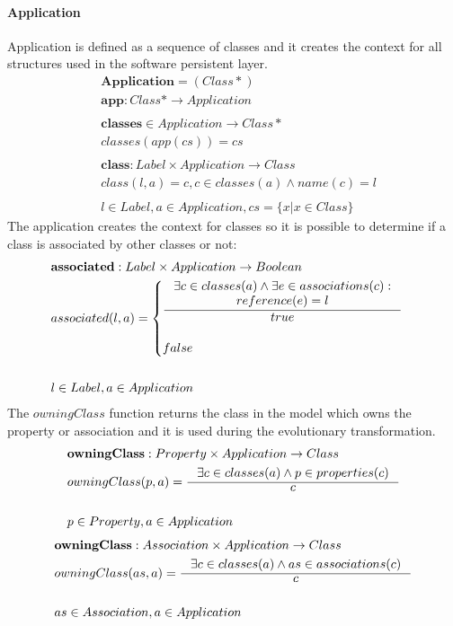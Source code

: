 \documentclass[11pt]{article}
\begin{document}
\paragraph{Application} Application is defined as a sequence of classes and it creates the context for all structures used in the software persistent layer.
\begin{align*}
& \mathbf{Application} = (Class*) \\ 
& \mathbf{app} : Class* \rightarrow  Application \\ \\
& \mathbf{classes} \in Application \rightarrow Class* \\
&   classes(app(cs)) = cs  \\\\
& \mathbf{class} : Label \times Application \rightarrow Class   \\ 
&  class(l, a) = c, c \in classes(a) \wedge name(c) = l \\ \\
&  l \in Label,a \in Application, cs = \{x | x \in Class\} 
\end{align*}
The application creates the context for classes so it is possible to determine if a class is associated by other classes or not:
\begin{align*}
& \mathbf{associated} : Label \times Application \rightarrow Boolean \\
& 	associated(l,a) = \begin{cases}
  		\inference{\exists c \in classes(a) \wedge \exists e \in associations(c) : \\ reference(e) = l
  	}{ true } \\\\
 		false
 	\end{cases} \\ \\
&	l \in Label, a \in Application
\end{align*}
The $owningClass$ function returns the class in the model which owns the property or association and it is used during the evolutionary transformation.
\begin{align*}
&	\mathbf{owningClass} : Property \times Application \rightarrow Class  \\ 	
&	owningClass(p, a) = \inference{\exists c \in classes(a) \wedge p \in properties(c)}{c}  \\ \\
&	p \in Property, a \in Application
\end{align*}
\begin{align*}
&	\mathbf{owningClass} : Association \times Application \rightarrow Class  \\
&	owningClass(as, a) = \inference{\exists c \in classes(a) \wedge as \in associations(c)}{c}  \\ \\	
&	as \in Association, a \in Application
\end{align*}
\end{document}
